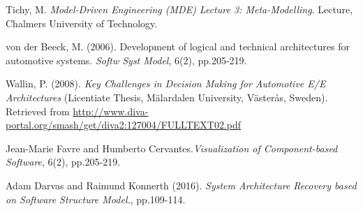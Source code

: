 \begin{thebibliography}{69}
Tichy, M. \textit{Model-Driven Engineering (MDE) Lecture 3: Meta-Modelling}. Lecture, Chalmers University of Technology.

von der Beeck, M. (2006). Development of logical and technical architectures for automotive systems. \textit{Softw Syst Model}, 6(2), pp.205-219.

Wallin, P. (2008). \textit{Key Challenges in Decision Making for Automotive E/E Architectures} (Licentiate Thesis, Mälardalen University, Västerås, Sweden). Retrieved from \url{http://www.diva-portal.org/smash/get/diva2:127004/FULLTEXT02.pdf} 

Jean-Marie Favre and Humberto Cervantes.\textit{Visualization of Component-based Software}, 6(2), pp.205-219.

Adam Darvas and Raimund Konnerth (2016). \textit{System Architecture Recovery based on Software Structure Model.}, pp.109-114.

\end{thebibliography}
